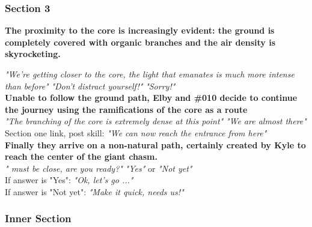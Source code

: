 \subsubsection{Section 3}
\vspace*{0.3cm}


	\textbf{The proximity to the core is increasingly evident: the ground is completely covered with organic branches and the air density is skyrocketing.}

\begin{dialogue}
	
	
	 \textit{"We're getting closer to the core, the light that emanates is much more intense than before"}
	  \textit{"Don't distract yourself!"}
	 \textit{"Sorry!"}\\
	
	
	\textbf{Unable to follow the ground path, Elby and \#010 decide to continue the journey using the ramifications of the core as a route}\\
	
	 \textit{"The branching of the core is extremely dense at this point"}
	 \textit{"We are almost there"}\\
	
	Section one link, post skill:
	 \textit{"We can now reach the entrance from here"}
	 \\
	
	
	\textbf{Finally they arrive on a non-natural path, certainly created by Kyle to reach the center of the giant chasm.}\\
	
	 \textit{" must be close, are you ready?"}
	 \textit{"Yes"} or \textit{"Not yet"}\\
	
	If answer is "Yes":
	 \textit{"Ok, let's go ..."}\\
	
	If answer is "Not yet":
	 \textit{"Make it quick,  needs us!"}
	
\end{dialogue}


\subsubsection{Inner Section}
\vspace*{0.3cm}

